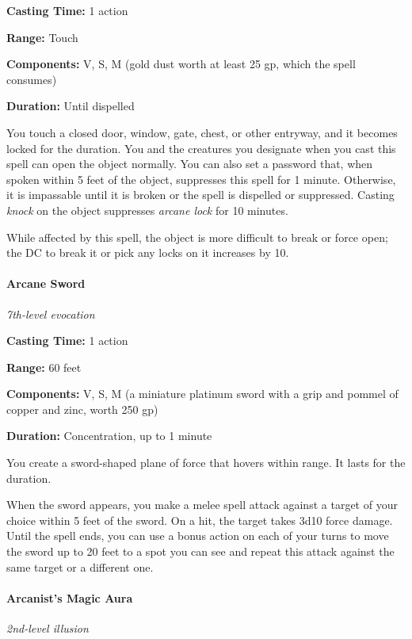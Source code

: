 \documentclass[
]{article}
\begin{document}
\textbf{Casting Time:} 1 action

\textbf{Range:} Touch

\textbf{Components:} V, S, M (gold dust worth at least 25 gp, which the
spell consumes)

\textbf{Duration:} Until dispelled

You touch a closed door, window, gate, chest, or other entryway, and it
becomes locked for the duration. You and the creatures you designate
when you cast this spell can open the object normally. You can also set
a password that, when spoken within 5 feet of the object, suppresses
this spell for 1 minute. Otherwise, it is impassable until it is broken
or the spell is dispelled or suppressed. Casting \emph{knock} on the
object suppresses \emph{arcane lock} for 10 minutes.

While affected by this spell, the object is more difficult to break or
force open; the DC to break it or pick any locks on it increases by 10.

\hypertarget{arcane-sword}{%
\paragraph{Arcane Sword}\label{arcane-sword}}

\emph{7th-level evocation}

\textbf{Casting Time:} 1 action

\textbf{Range:} 60 feet

\textbf{Components:} V, S, M (a miniature platinum sword with a grip and
pommel of copper and zinc, worth 250 gp)

\textbf{Duration:} Concentration, up to 1 minute

You create a sword-shaped plane of force that hovers within range. It
lasts for the duration.

When the sword appears, you make a melee spell attack against a target
of your choice within 5 feet of the sword. On a hit, the target takes
3d10 force damage. Until the spell ends, you can use a bonus action on
each of your turns to move the sword up to 20 feet to a spot you can see
and repeat this attack against the same target or a different one.

\hypertarget{arcanists-magic-aura}{%
\paragraph{Arcanist's Magic Aura}\label{arcanists-magic-aura}}

\emph{2nd-level illusion}
\end{document}
